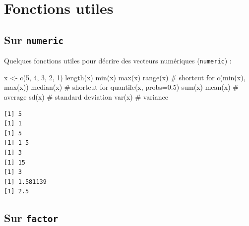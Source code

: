 \documentclass[
  letterpaper,
  DIV=11,
  numbers=noendperiod]{scrreprt}
\newenvironment{Shaded}{\begin{snugshade}}{\end{snugshade}}
\newcommand{\CommentTok}[1]{\textcolor[rgb]{0.37,0.37,0.37}{#1}}
\newcommand{\DecValTok}[1]{\textcolor[rgb]{0.68,0.00,0.00}{#1}}
\newcommand{\FunctionTok}[1]{\textcolor[rgb]{0.28,0.35,0.67}{#1}}
\newcommand{\NormalTok}[1]{\textcolor[rgb]{0.00,0.23,0.31}{#1}}
\newcommand{\OtherTok}[1]{\textcolor[rgb]{0.00,0.23,0.31}{#1}}
\begin{document}
\hypertarget{fonctions-utiles}{%
\section{Fonctions utiles}\label{fonctions-utiles}}

\hypertarget{sur-numeric}{%
\subsection{\texorpdfstring{Sur
\texttt{numeric}}{Sur numeric}}\label{sur-numeric}}

Quelques fonctions utiles pour décrire des vecteurs numériques
(\texttt{numeric}) :

\begin{Shaded}
\begin{Highlighting}[]
\NormalTok{x }\OtherTok{\textless{}{-}} \FunctionTok{c}\NormalTok{(}\DecValTok{5}\NormalTok{, }\DecValTok{4}\NormalTok{, }\DecValTok{3}\NormalTok{, }\DecValTok{2}\NormalTok{, }\DecValTok{1}\NormalTok{)}
\FunctionTok{length}\NormalTok{(x) }
\FunctionTok{min}\NormalTok{(x)}
\FunctionTok{max}\NormalTok{(x)}
\FunctionTok{range}\NormalTok{(x)  }\CommentTok{\# shortcut for c(min(x), max(x))}
\FunctionTok{median}\NormalTok{(x) }\CommentTok{\# shortcut for quantile(x, probs=0.5)}
\FunctionTok{sum}\NormalTok{(x)}
\FunctionTok{mean}\NormalTok{(x)   }\CommentTok{\# average}
\FunctionTok{sd}\NormalTok{(x)     }\CommentTok{\# standard deviation}
\FunctionTok{var}\NormalTok{(x)    }\CommentTok{\# variance}
\end{Highlighting}
\end{Shaded}

\begin{verbatim}
[1] 5
[1] 1
[1] 5
[1] 1 5
[1] 3
[1] 15
[1] 3
[1] 1.581139
[1] 2.5
\end{verbatim}

\hypertarget{sur-factor}{%
\subsection{\texorpdfstring{Sur
\texttt{factor}}{Sur factor}}\label{sur-factor}}
\end{document}
